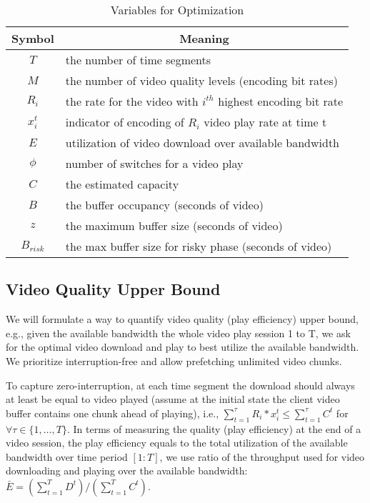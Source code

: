 \begin{table} [bt]
\small
\begin{tabular} {|c |l |}
\hline
\textbf{Symbol}&\multicolumn{1}{c|}{\textbf{Meaning} }\\ \hline
$T$ &the number of time segments\\ \hline
$M$ &the number of video quality levels (encoding bit rates)\\ \hline
$R_i$& the rate for the video with $i^{th}$ highest encoding bit rate\\ \hline
$x_i^t$&indicator of encoding of $R_i$ video play rate at time t\\ \hline
$E$& utilization of video download over available bandwidth \\ \hline
$\phi$ &number of switches for a video play\\ \hline
$C $ &the estimated capacity\\ \hline
$B $ &the buffer occupancy (seconds of video) \\ \hline
$z $ &the maximum buffer size (seconds of video) \\ \hline
$B_{risk} $ &the max buffer size for risky phase (seconds of video) \\ \hline
\end{tabular}
\centering
\caption{Variables for Optimization}
\end{table}
\subsection{Video Quality Upper Bound}\label{subsec:offline}
We will formulate a way to quantify video quality (play efficiency) upper bound, e.g., given the available bandwidth the whole video play session 1 to T, we ask for the optimal video download and play to best utilize the available bandwidth. We prioritize interruption-free and allow prefetching unlimited video chunks. 

To capture zero-interruption, at each time segment the download should always at least be equal to video played (assume at the initial state the client video buffer contains one chunk ahead of playing), i.e., $\sum \limits_{t=1}^\tau R_i * x_i^t\leq\sum\limits_{t=1}^\tau C^t$ for $\forall \tau \in \{1, \dots, T\}$. In terms of measuring the quality (play efficiency) at the end of a video session, the play efficiency equals to the total utilization of the available bandwidth over time period $[1:T]$, we use ratio of the throughput used for video downloading and playing over the available bandwidth: $\bar{E}=(\sum\limits_{t=1}^T D^t)/(\sum\limits_{t=1}^T C^t)$.


